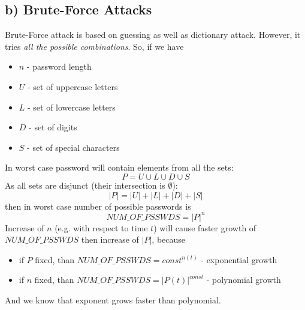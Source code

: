 \documentclass{article}
\begin{document}
\subsection*{b) Brute-Force Attacks}
Brute-Force attack is based on guessing as well as dictionary attack. However, it tries \textit{all the possible combinations}. So, if we have
\begin{itemize}
\item $n$ - password length
\item $U$ - set of uppercase letters
\item $L$ - set of lowercase letters
\item $D$ - set of digits
\item $S$ - set of special characters
\end{itemize}
In worst case password will contain elements from all the sets:
$$P=U \cup L \cup D \cup S$$
As all sets are disjunct (their intersection is $\emptyset$):
$$|P|=|U|+|L|+|D|+|S|$$
then in worst case number of possible passwords is $$NUM\_OF\_PSSWDS=|P|^n$$
Increase of $n$ (e.g. with respect to time $t$) will cause faster growth of $NUM\_OF\_PSSWDS$ then increase of $|P|$, because
\begin{itemize}
\item if $P$ fixed, than $NUM\_OF\_PSSWDS=const^{n(t)}$ - exponential growth
\item if $n$ fixed, than $NUM\_OF\_PSSWDS=|P(t)|^{const}$ - polynomial growth 
\end{itemize}
And we know that exponent grows faster than polynomial.
\end{document}
